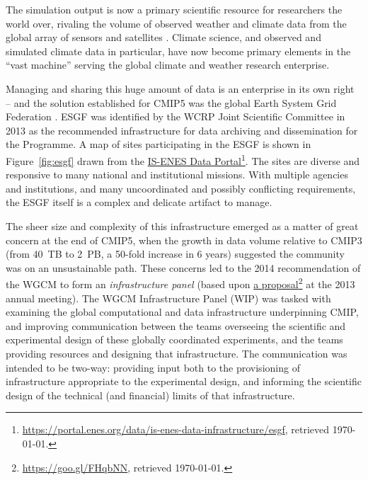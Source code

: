 \documentclass[gmd,manuscript]{copernicus}
\newcommand{\urlref}[2] {\href{#1}{#2}\footnote{\url{#1}, retrieved \today.}}
\begin{document}
The simulation output is now a primary scientific resource for
researchers the world over, rivaling the volume of observed weather
and climate data from the global array of sensors and satellites
\citep{ref:overpecketal2011}. Climate science, and observed and simulated
climate data in particular, have now become primary elements in the
``vast machine'' \citep{ref:edwards2010} serving the global climate and
weather research enterprise.

Managing and sharing this huge amount of data is an enterprise in its
own right -- and the solution established for CMIP5 was the global
Earth System Grid Federation
\citep[ESGF,][]{ref:williamsetal2011a,ref:williamsetal2015}. ESGF was
identified by the WCRP Joint Scientific Committee in 2013 as the
recommended infrastructure for data archiving and dissemination for
the Programme.
A map of sites participating in the ESGF is shown in
Figure~\ref{fig:esgf} drawn from the
\urlref{https://portal.enes.org/data/is-enes-data-infrastructure/esgf}{IS-ENES
  Data Portal}. The sites are diverse and responsive to many national
and institutional missions. With multiple agencies and institutions,
and many uncoordinated and possibly conflicting requirements, the ESGF
itself is a complex and delicate
artifact to manage.

\begin{figure*}
  \begin{center}
  \end{center}
  \caption{Sites participating in the Earth System Grid Federation in
    May 2017. Figure courtesy IS-ENES Data Portal. }
  \label{fig:esgf}
\end{figure*}

The sheer size and complexity of this infrastructure emerged as a
matter of great concern at the end of CMIP5, when the growth in data
volume relative to CMIP3 (from 40~TB to 2~PB, a 50-fold increase in 6
years) suggested the community was on an unsustainable path. These
concerns led to the 2014 recommendation of the WGCM to form an
\emph{infrastructure panel} (based upon
\urlref{https://goo.gl/FHqbNN}{a proposal} at the 2013 annual
meeting). The WGCM Infrastructure Panel (WIP) was tasked with
examining the global computational and data infrastructure
underpinning CMIP, and improving communication between the teams
overseeing the scientific and experimental design of these globally
coordinated experiments, and the teams providing resources and
designing that infrastructure. The communication was intended to be
two-way: providing input both to the provisioning of infrastructure
appropriate to the experimental design, and informing the scientific
design of the technical (and financial) limits of that infrastructure.
\end{document}
